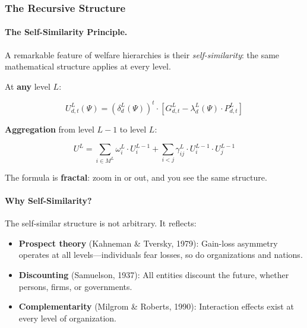 \subsubsection{The Recursive Structure}

\paragraph{The Self-Similarity Principle.}
A remarkable feature of welfare hierarchies is their \textit{self-similarity}: 
the same mathematical structure applies at every level.

\begin{tcolorbox}[colback=yellow!5!white, colframe=yellow!50!black, title=The Recursive Welfare Formula]
At \textbf{any} level $L$:

\begin{equation}
\boxed{
U^L_{d,t}(\Psi) = \left(\delta^L_d(\Psi)\right)^t \cdot \left[ G^L_{d,t} - \lambda^L_d(\Psi) \cdot P^L_{d,t} \right]
}
\end{equation}

\textbf{Aggregation} from level $L-1$ to level $L$:

\begin{equation}
\boxed{
U^L = \sum_{i \in M^L} \omega^L_i \cdot U^{L-1}_i + \sum_{i < j} \gamma^L_{ij} \cdot U^{L-1}_i \cdot U^{L-1}_j
}
\end{equation}

The formula is \textbf{fractal}: zoom in or out, and you see the same structure.
\end{tcolorbox}

\paragraph{Why Self-Similarity?}
The self-similar structure is not arbitrary. It reflects:
\begin{itemize}
\item \textbf{Prospect theory} (Kahneman \& Tversky, 1979): Gain-loss asymmetry 
operates at all levels---individuals fear losses, so do organizations and nations.
\item \textbf{Discounting} (Samuelson, 1937): All entities discount the future, 
whether persons, firms, or governments.
\item \textbf{Complementarity} (Milgrom \& Roberts, 1990): Interaction effects 
exist at every level of organization.
\end{itemize}

